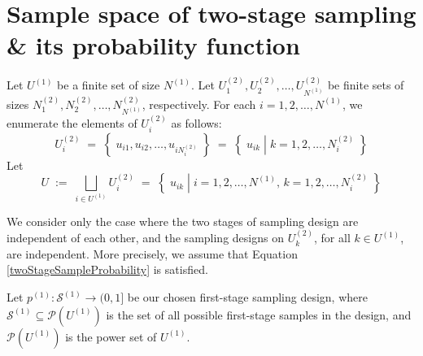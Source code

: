 \documentclass{article}
\begin{document}


\pagestyle{fancy}

%

\lfoot[]{}
\cfoot[]{}
\rfoot[]{\thepage}



\mbox{}\vskip 0.0cm
\section{Sample space of two-stage sampling \& its probability function}
\setcounter{theorem}{0}

Let $U^{(1)}$ be a finite set of size $N^{(1)}$.
Let $U^{(2)}_{1}, U^{(2)}_{2},\ldots,U^{(2)}_{N^{(1)}}$ be finite sets
of sizes $N^{(2)}_{1}, N^{(2)}_{2},\ldots,N^{(2)}_{N^{(1)}}$, respectively.
For each $i = 1, 2, \ldots, N^{(1)}$, we enumerate the elements of $U^{(2)}_{i}$ as follows:
\begin{equation*}
U^{(2)}_{i}
\;=\; \left\{\;u_{i1},u_{i2},\ldots,u_{iN^{(2)}_{i}}\;\right\}
\;=\; \left\{\;u_{ik}\;\left\vert\; k = 1,2,\ldots,N^{(2)}_{i}\right.\;\right\}
\end{equation*}
Let
\begin{equation*}
U
\;:=\; \bigsqcup_{i \in U^{(1)}}U^{(2)}_{i}
\;=\;  \left\{\;u_{ik}\;\left\vert\; i=1,2,\ldots,N^{(1)},\,k = 1,2,\ldots,N^{(2)}_{i}\right.\;\right\}
\end{equation*}

\vskip 0.3cm
\begin{remark}\quad
We consider only the case where the two stages of sampling design are independent
of each other, and the sampling designs on $U^{(2)}_{k}$, for all $k \in U^{(1)}$, are
independent.
More precisely, we assume that Equation \eqref{twoStageSampleProbability} is satisfied.
\end{remark}

\vskip 0.3cm
\noindent
Let $p^{(1)}:\mathcal{S}^{(1)} \longrightarrow (0,1]$ be our chosen first-stage sampling design,
where $\mathcal{S}^{(1)} \subseteq \mathcal{P}\!\left(U^{(1)}\right)$
is the set of all possible first-stage samples in the design, and
$\mathcal{P}\!\left(U^{(1)}\right)$ is the power set of $U^{(1)}$.
\end{document}
